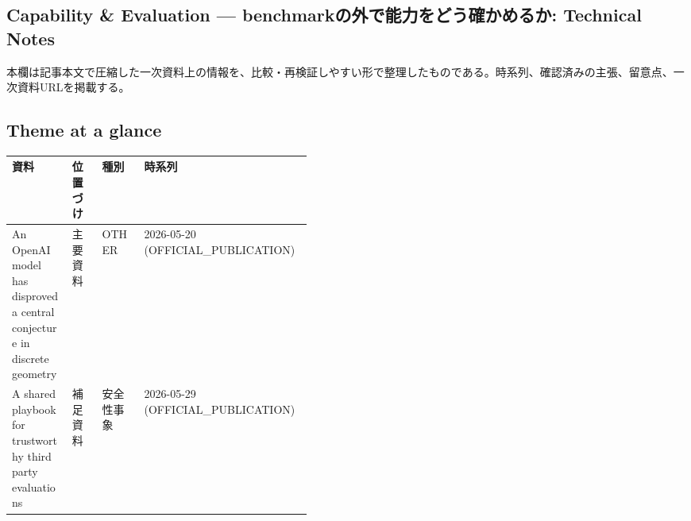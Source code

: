 \subsection*{Capability \& Evaluation — benchmarkの外で能力をどう確かめるか: Technical Notes}
本欄は記事本文で圧縮した一次資料上の情報を、比較・再検証しやすい形で整理したものである。時系列、確認済みの主張、留意点、一次資料URLを掲載する。
\medskip
\subsection*{Theme at a glance}
\begin{center}
\footnotesize
\begin{tabularx}{\linewidth}{@{}p{0.20\linewidth}p{0.10\linewidth}p{0.14\linewidth}X@{}}
\toprule
資料 & 位置づけ & 種別 & 時系列 \\
\midrule
An OpenAI model has disproved a central conjecture in discrete geometry & 主要資料 & OTHER & 2026-05-20 (OFFICIAL\_PUBLICATION) \\
A shared playbook for trustworthy third party evaluations & 補足資料 & 安全性事象 & 2026-05-29 (OFFICIAL\_PUBLICATION) \\
\bottomrule
\end{tabularx}
\end{center}
\normalsize

